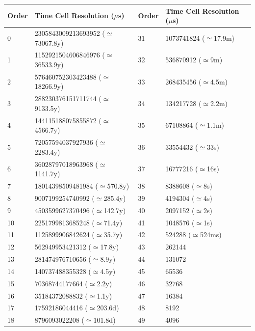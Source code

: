 
\begin{table}[!htbp]
\smallskip
\begin{center}
   {\scriptsize
   \begin{tabular} {|l | l| l| l| l|}
   \hline
   Order & Time Cell Resolution ($\mu$s)  & Order & Time Cell Resolution ($\mu$s) \\
   \hline
0       &       2305843009213693952 ($\simeq$73067.8y) 	& 31   & 1073741824 ($\simeq$17.9m) \\
1       &       1152921504606846976 ($\simeq$36533.9y) 	& 32   & 536870912 ($\simeq$9m) \\
2       &       576460752303423488 ($\simeq$18266.9y)	& 33   & 268435456 ($\simeq$4.5m) \\
3       &       288230376151711744 ($\simeq$9133.5y)	& 34   & 134217728 ($\simeq$2.2m) \\
4       &       144115188075855872 ($\simeq$4566.7y)	& 35   & 67108864 ($\simeq$1.1m) \\
5       &       72057594037927936 ($\simeq$2283.4y)	& 36   & 33554432 ($\simeq$33s) \\
6       &       36028797018963968 ($\simeq$1141.7y)	& 37   & 16777216 ($\simeq$16s) \\
7       &       18014398509481984 ($\simeq$570.8y)	& 38   & 8388608 ($\simeq$8s) \\
8       &       9007199254740992 ($\simeq$285.4y)	& 39   & 4194304 ($\simeq$4s) \\
9       &       4503599627370496 ($\simeq$142.7y)	& 40   & 2097152 ($\simeq$2s) \\
10      &       2251799813685248 ($\simeq$71.4y)	& 41   & 1048576 ($\simeq$1s) \\
11      &       1125899906842624 ($\simeq$35.7y)	& 42   & 524288 ($\simeq$524ms) \\
12      &       562949953421312 ($\simeq$17.8y)		& 43   & 262144 \\
13      &       281474976710656 ($\simeq$8.9y)		& 44   & 131072 \\
14      &       140737488355328 ($\simeq$4.5y)		& 45   & 65536 \\
15      &       70368744177664 ($\simeq$2.2y)		& 46   & 32768 \\
16      &       35184372088832 ($\simeq$1.1y)		& 47   & 16384 \\
17      &       17592186044416 ($\simeq$203.6d)		& 48   & 8192 \\
18      &       8796093022208   ($\simeq$101.8d)	& 49   & 4096 \\

\end{tabular}}
\end{center}
\end{table}
